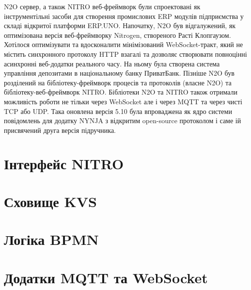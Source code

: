 N2O сервер, а також NITRO веб-фреймворк були спроектовані як інструментільні засоби
для створення промислових ERP модулів підприємства у складі відкритої платформи ERP.UNO.
Напочатку, N2O був відгалужений, як оптимізована версія веб-фреймворку Nitrogen,
створеного Расті Клопгаузом. Хотілося оптимізувати та вдосконалити мінімізований
WebSocket-тракт, який не містить синхронного протоколу HTTP взагалі та дозволяє
створювати повноцінні асинхронні веб-додатки реального часу. На ньому була створена
система управління депозитами в національному банку ПриватБанк. Пізніше N2O був розділений
на бібліотеку-фреймворк процесів та протоколів (власне N2O) та бібліотеку-веб-фреймворк NITRO.
Бібліотеки N2O та NITRO також отримали можливість роботи не тільки через WebSocket але і
через MQTT та через чисті TCP або UDP. Така оновлена версія 5.10 була впроваджена як ядро
системи повідомлень для додатку NYNJA з відкритим open-source протоколом і саме ій
присвячений друга версія підручника.


\section{Інтерфейс NITRO}

\section{Сховище KVS}

\section{Логіка BPMN}



\section{Додатки MQTT та WebSocket}

